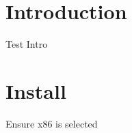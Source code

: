 \hypertarget{index_sec_intro}{}\section{Introduction}\label{index_sec_intro}
Test Intro\hypertarget{index_sec_running}{}\section{Install}\label{index_sec_running}
Ensure x86 is selected 